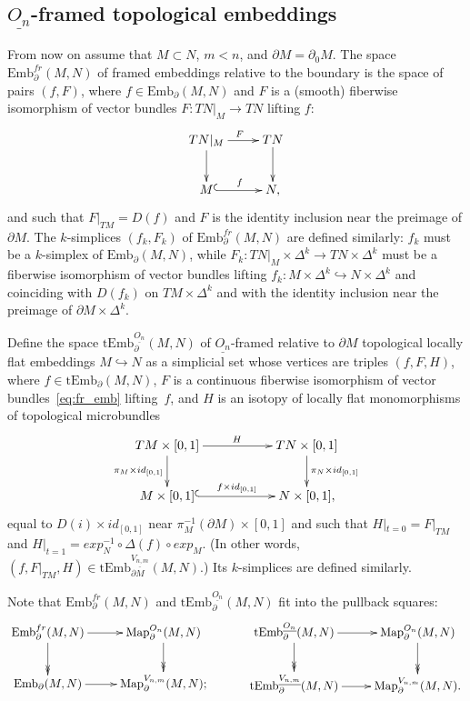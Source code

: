 \documentclass[11pt]{amsart}
\theoremstyle{definition}
\newcommand{\Emb}{\mathrm{Emb}}
\newcommand{\tEmb}{\mathrm{tEmb}}
\newcommand{\Map}{\mathrm{Map}}
\numberwithin{equation}{section}
\begin{document}
\subsection{$\underline{O_n}$-framed topological embeddings}\label{ss:On_fr}
From now on assume that $M\subset N$, $m<n$, and $\partial M=\partial_0 M$. The space $\Emb_{\partial }^{fr}(M,N)$ of  framed embeddings relative to the boundary is the space of pairs $(f,F)$, where $f\in\Emb_{\partial }(M,N)$ and $F$ is a (smooth) fiberwise isomorphism of vector bundles $F\colon TN|_{M}\to TN$  lifting $f$:
\begin{equation}\label{eq:fr_emb}
\xymatrix{
TN|_{M}\ar[d]\ar[r]^{F}&TN\ar[d]\\
M\ar@{^{(}->}[r]^{f}& N,
}
\end{equation}
and such that  $F|_{TM}=D(f)$ and $F$ is the identity inclusion near the preimage of $\partial M$. 
The $k$-simplices $(f_k,F_k)$ of $\Emb_{\partial}^{fr}(M,N)$  are defined similarly: $f_k$ must be a $k$-simplex of  
$\Emb_{\partial}(M,N)$, while $F_k\colon TN|_{M}\times\Delta^k\to TN\times\Delta^k$ must be a fiberwise isomorphism of vector bundles
lifting $f_k\colon M\times\Delta^k\hookrightarrow N\times\Delta^k$ and coinciding with $D(f_k)$ on $TM\times \Delta^k$ and with the identity inclusion near the preimage of
 $\partial M\times\Delta^k$.

Define the space $\tEmb_{\partial}^{\underline{O_n}}(M,N)$ of $\underline{O_n}$-framed relative to $\partial M$ topological locally flat embeddings
$M\hookrightarrow N$ as a simplicial set whose vertices are triples $(f,F,H)$, where $f\in\tEmb_{\partial}(M,N)$, $F$ is a continuous fiberwise isomorphism of vector bundles~\eqref{eq:fr_emb} lifting~$f$, and $H$ is an isotopy of locally flat monomorphisms of topological microbundles
\begin{equation}\label{eq:isot_tmono}
\xymatrix{
TM\times [0,1]\ar[d]_{\pi_M\times id_{[0,1]}}\ar[rr]^{H}&&TN\times[0,1]\ar[d]^{\pi_N\times id_{[0,1]}}\\
M\times [0,1]\ar@{^{(}->}[rr]^{f\times id_{[0,1]}}&& N\times [0,1],
}
\end{equation}
equal to $D(i)\times id_{[0,1]}$ near $\pi_M^{-1}(\partial M)\times [0,1]$ and such that $H|_{t=0}=F|_{TM}$ and $H|_{t=1}=
exp_N^{-1}\circ \Delta(f)\circ exp_M$. (In other words, $(f,F|_{TM},H)\in \tEmb^{\underline{V_{n,m}}}_{\partial M}(M,N)$.) Its $k$-simplices are defined similarly.

Note that $\Emb_{\partial}^{fr}(M,N)$ and $\tEmb_{\partial}^{\underline{O_n}}(M,N)$ fit into the pullback squares:
\begin{equation}\label{eq:pb_squares}
\xymatrix{
\Emb_{\partial }^{fr}(M,N)\ar[r] \ar@{->>}[d]& \Map_{\partial }^{O_n}(M,N)\ar@{->>}[d]\\
\Emb_{\partial }(M,N)\ar[r]&  \Map_{\partial }^{V_{n,m}}(M,N);
}
\quad\quad\quad
\xymatrix{
\tEmb_{\partial }^{\underline{O_n}}(M,N)\ar[r] \ar@{->>}[d]& \Map_{\partial }^{O_n}(M,N)\ar@{->>}[d]\\
\tEmb_{\partial }^{\underline{V_{n,m}}}(M,N)\ar[r]&  \Map_{\partial }^{V_{n,m}}(M,N).
}
\end{equation}
\end{document}
